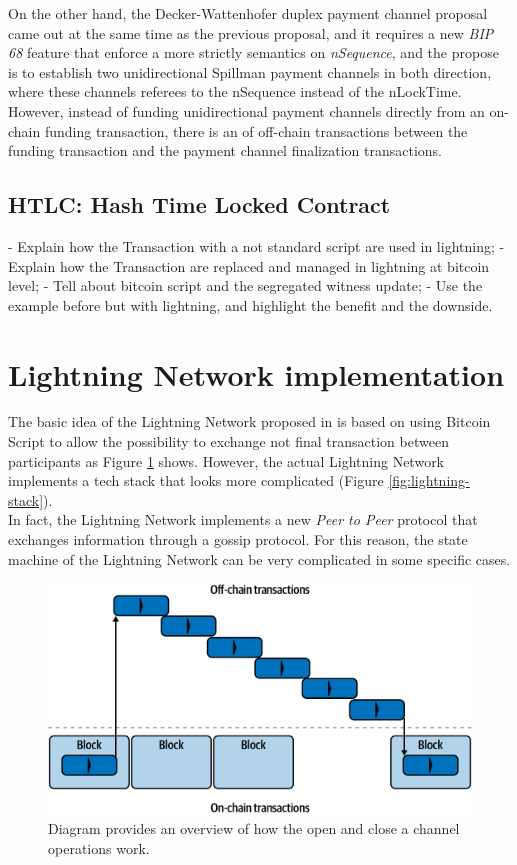 On the other hand, the Decker-Wattenhofer duplex payment channel proposal came out at the same time as the previous proposal, and
it requires a new \emph{BIP 68}\cite{bip68} feature that enforce a more strictly semantics on \emph{nSequence}, and the propose is to
establish two unidirectional Spillman payment channels in both
direction, where these channels referees to the nSequence instead of the nLockTime.
However, instead of funding unidirectional payment channels directly from an on-chain funding transaction, there is an  of off-chain transactions between the funding transaction and the payment channel finalization transactions.

\subsection{HTLC: Hash Time Locked Contract}
\label{sec:htlc_intro}

- Explain how the Transaction with a not standard script are used in lightning;
- Explain how the Transaction are replaced and managed in lightning at bitcoin level;
- Tell about bitcoin script and the segregated witness update;
- Use the example before but with lightning, and highlight the benefit and the downside.

\section{Lightning Network implementation}

The basic idea of the Lightning Network proposed in \cite{lightning-network-paper} is based on using Bitcoin Script
to allow the possibility to exchange not final transaction between participants as Figure \ref{fig:ln-onchain} shows.
However, the actual Lightning Network implements a tech stack that looks more complicated (Figure \ref{fig:lightning-stack}).\\
In fact, the Lightning Network implements a new \emph{Peer to Peer} protocol that exchanges information through
a gossip protocol. For this reason, the state machine of the Lightning Network
can be very complicated in some specific cases.

\begin{figure}[h]
  \begin{center}
  \includegraphics[width=0.6\columnwidth]{imgs/mtln_0702.png}
  \end{center}
  \caption{Diagram provides an overview of how the open and close a channel operations work.}
  \label{fig:ln-onchain}
\end{figure}


